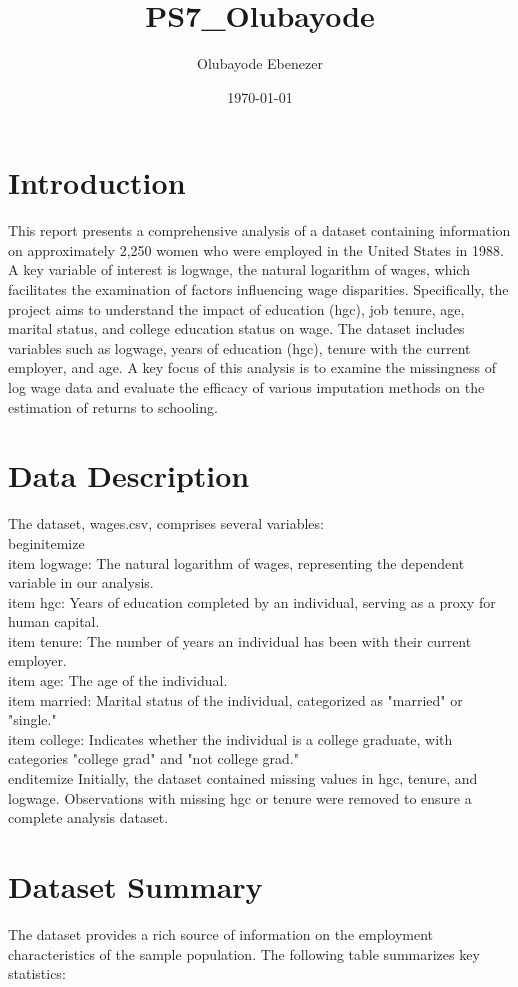 \documentclass[12pt]{article}
\title{PS7_Olubayode }
\author{Olubayode Ebenezer}
\date{\today}
\begin{document}
\maketitle

\section{Introduction}
This report presents a comprehensive analysis of a dataset containing information on approximately 2,250 women who were employed in the United States in 1988. A key variable of interest is logwage, the natural logarithm of wages, which facilitates the examination of factors influencing wage disparities. Specifically, the project aims to understand the impact of education (hgc), job tenure, age, marital status, and college education status on wage. The dataset includes variables such as logwage, years of education (hgc), tenure with the current employer, and age. A key focus of this analysis is to examine the missingness of log wage data and evaluate the efficacy of various imputation methods on the estimation of returns to schooling.

\section*{Data Description}
The dataset, wages.csv, comprises several variables:
\\begin{itemize}
    \\item logwage: The natural logarithm of wages, representing the dependent variable in our analysis.
    \\item hgc: Years of education completed by an individual, serving as a proxy for human capital.
    \\item tenure: The number of years an individual has been with their current employer.
    \\item age: The age of the individual.
    \\item married: Marital status of the individual, categorized as "married" or "single."
    \\item college: Indicates whether the individual is a college graduate, with categories "college grad" and "not college grad."
\\end{itemize}
Initially, the dataset contained missing values in hgc, tenure, and logwage. Observations with missing hgc or tenure were removed to ensure a complete analysis dataset.


\section{Dataset Summary}
The dataset provides a rich source of information on the employment characteristics of the sample population. The following table summarizes key statistics:
\end{document}
